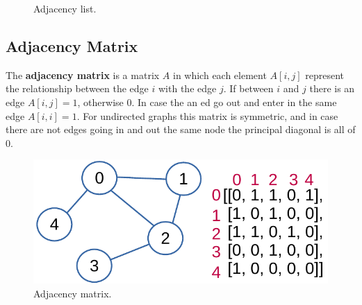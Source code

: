 \begin{figure}[H]
\centering
{}  
\caption[Adjacency list.]{Adjacency list.}
\label{graphs_4}
\end{figure}

\subsection{Adjacency Matrix}
The \textbf{adjacency matrix} is a matrix \(A\) in which each element \(A[i, j]\) represent the relationship between the edge \(i\) with the edge \(j\). If between \(i\) and \(j\) there is an edge \(A[i, j] = 1\), otherwise \(0\). In case the an ed go out and enter in the same edge \(A[i, i] = 1\). For undirected graphs this matrix is symmetric, and in case there are not edges going in and out the same node the principal diagonal is all of \(0\).

\begin{figure}[H]
	\begin{center}
		\includegraphics[scale=.6]{chapters/graphs/images/graphs_5.pdf}
		\caption[Adjacency matrix.]{Adjacency matrix.}
		\label{graphs_5}
	\end{center}
\end{figure}

